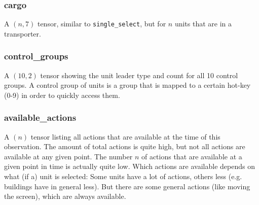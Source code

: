 \documentclass{article}
\begin{document}
\subsubsection{cargo}
A $(n, 7)$ tensor, similar to \texttt{single\_select}, but for $n$ units that 
are in a transporter.


\subsubsection{control\_groups}
A $(10, 2)$ tensor showing the unit leader type and count for all 10 control 
groups. A control group of units is a group that is mapped to a certain hot-key 
(0-9) in order to quickly access them.


\subsubsection{available\_actions}
A $(n)$ tensor listing all actions that are available at the time of this 
observation. The amount of total actions is quite high, but not all actions are 
available at any given point. The number $n$ of actions that are available at a 
given point in time is actually quite low. Which actions are available depends 
on what (if a) unit is selected: Some units have a lot of actions, others less 
(e.g. buildings have in general less). But there are some general actions (like 
moving the screen), which are always available.
\end{document}
